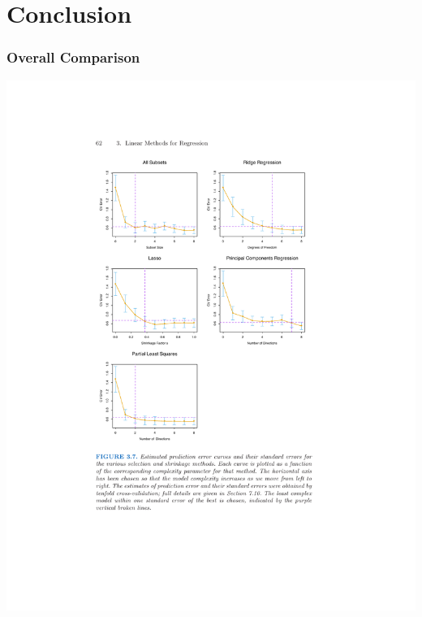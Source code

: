\section{Conclusion}

\begin{frame}
    \frametitle{Overall Comparison}
    \vspace{-15pt}
    \begin{center}
    \includegraphics[height=0.85\textheight]{./resources/comparisons}
    \end{center}
\end{frame}
    
